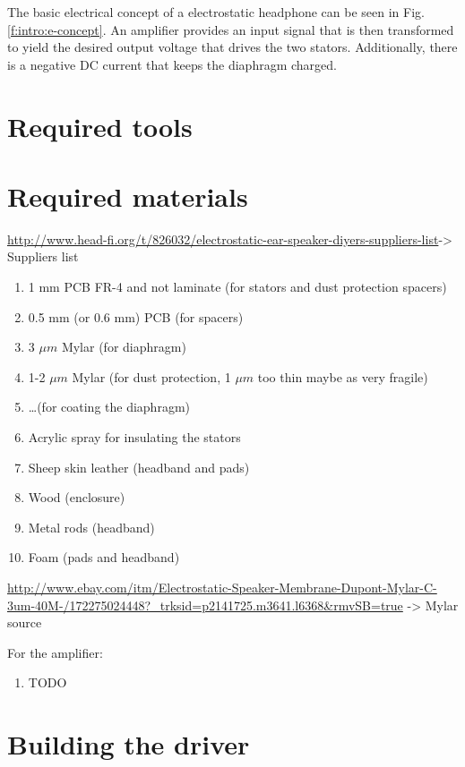 \documentclass{article}
\begin{document}
The basic electrical concept of a electrostatic headphone can be seen in Fig. \ref{f:intro:e-concept}. An amplifier provides an input signal that is then transformed to yield the desired output voltage that drives the two stators. Additionally, there is a negative DC current that keeps the diaphragm charged.

\section{Required tools}
\label{s:tools}

\section{Required materials}
\label{s:materials}
\url{http://www.head-fi.org/t/826032/electrostatic-ear-speaker-diyers-suppliers-list}-> Suppliers list
\begin{enumerate}
    \item 1 mm PCB FR-4 and not laminate (for stators and dust protection spacers)
    \item 0.5 mm (or 0.6 mm) PCB (for spacers)
    \item 3 $\mu m$ Mylar (for diaphragm)
    \item 1-2 $\mu m$ Mylar (for dust protection, 1 $\mu m$ too thin maybe as very fragile) %
    \item \ldots (for coating the diaphragm) %
    \item Acrylic spray for insulating the stators
    \item Sheep skin leather (headband and pads)
    \item Wood (enclosure)
    \item Metal rods (headband)
    \item Foam (pads and headband)
\end{enumerate}

\url{http://www.ebay.com/itm/Electrostatic-Speaker-Membrane-Dupont-Mylar-C-3um-40M-/172275024448?_trksid=p2141725.m3641.l6368&rmvSB=true} -> Mylar source

For the amplifier:
\begin{enumerate}
    \item TODO
\end{enumerate}

\section{Building the driver}
\label{s:driver}
\end{document}
